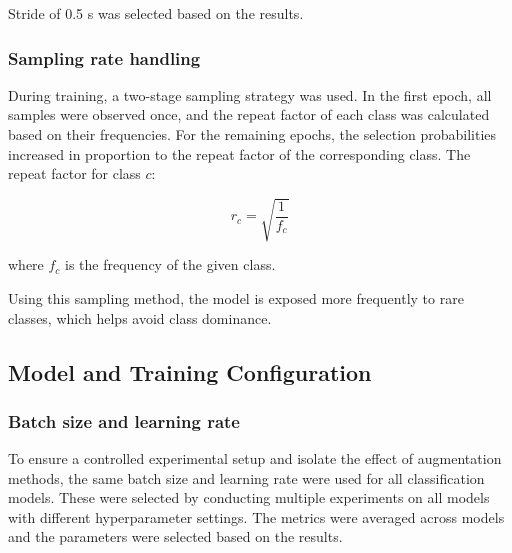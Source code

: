 Stride of 0.5 s was selected based on the results.

\subsubsection{Sampling rate handling}

During training, a two-stage sampling strategy was used. In the first epoch, all samples were observed once, and the repeat factor of each class was calculated based on their frequencies. For the remaining epochs, the selection probabilities increased in proportion to the repeat factor of the corresponding class. The repeat factor for class $c$:

\[
r_c = \sqrt{\frac{1}{f_c}}
\]

where $f_c$ is the frequency of the given class.

Using this sampling method, the model is exposed more frequently to rare classes, which helps avoid class dominance.

\subsection{Model and Training Configuration}

\subsubsection{Batch size and learning rate}

To ensure a controlled experimental setup and isolate the effect of augmentation methods, the same batch size and learning rate were used for all classification models. These were selected by conducting multiple experiments on all models with different hyperparameter settings. The metrics were averaged across models and the parameters were selected based on the results.

